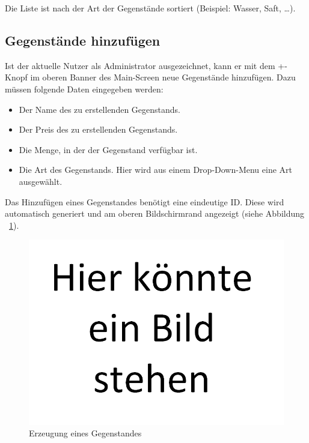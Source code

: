 \documentclass{scrartcl}
\begin{document}
	Die Liste ist nach der Art der Gegenstände sortiert (Beispiel: Wasser, Saft, \ldots).

	\subsection{Gegenstände hinzufügen}\label{subsec:gegenstände-hinzufügen}

	Ist der aktuelle Nutzer als Administrator ausgezeichnet, kann er mit dem +-Knopf im oberen Banner des Main-Screen neue Gegenstände hinzufügen.
	Dazu müssen folgende Daten eingegeben werden:

	\begin{itemize}
		\item Der Name des zu erstellenden Gegenstands.

		\item Der Preis des zu erstellenden Gegenstands.

		\item Die Menge, in der der Gegenstand verfügbar ist.

		\item Die Art des Gegenstands.
		Hier wird aus einem Drop-Down-Menu eine Art ausgewählt.
	\end{itemize}

	Das Hinzufügen eines Gegenstandes benötigt eine eindeutige ID. Diese wird automatisch generiert und am oberen Bildschirmrand angezeigt (siehe Abbildung ~\ref{createItem}).

	\begin{figure}[!h]
		\centering
		\includegraphics[scale=0.5]{./figures/placeholder.png}
		\caption{Erzeugung eines Gegenstandes}
		\label{createItem}
	\end{figure}
\end{document}
